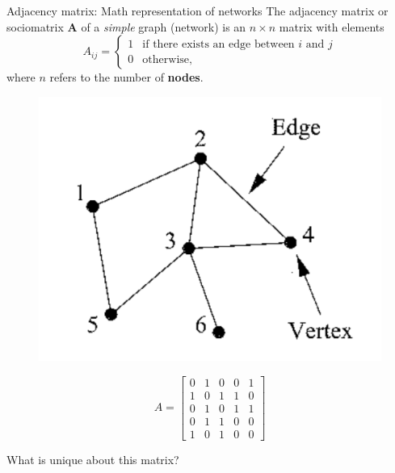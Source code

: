 \documentclass[10pt]{beamer}
\begin{document}
\begin{frame}{Adjacency matrix: Math representation of networks}
The adjacency matrix or sociomatrix \textbf{A} of a \textit{simple} graph (network) is an $n\times n$ matrix with elements
	\begin{equation}
	A_{ij} =
	\begin{cases}
	1 & \text{if there exists an edge between $i$ and $j$}\\
	0 & \text{otherwise},
	\end{cases}
	\end{equation}
where $n$ refers to the number of \textbf{nodes}.
\end{frame}

\begin{frame}
	\begin{figure}
	\centering
	\includegraphics[scale=0.2]{Figs/ex}
	\end{figure}
	\vspace{0.2cm}
	\begin{equation}
	A =
	\begin{bmatrix}
	0 & 1 & 0 & 0 & 1 \\
	1 & 0 & 1 & 1 & 0 \\
	0 & 1 & 0 & 1 & 1 \\
	0 & 1 & 1 & 0 & 0 \\
	1 & 0 & 1 & 0 & 0		
	\end{bmatrix}
	\end{equation}

\vspace{0.2cm}
What is unique about this matrix?
\end{frame}
\end{document}

